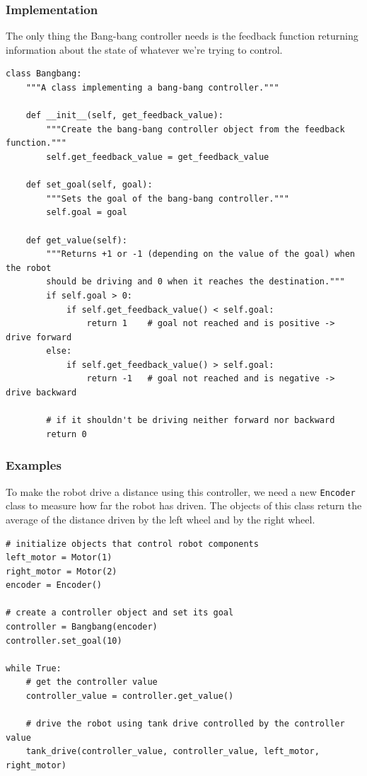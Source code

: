 \documentclass[12pt,twoside]{article}
\begin{document}
\subsubsection{Implementation}
The only thing the Bang-bang controller needs is the feedback function returning information about the state of whatever we're trying to control.

\begin{verbatim}
class Bangbang:
    """A class implementing a bang-bang controller."""

    def __init__(self, get_feedback_value):
        """Create the bang-bang controller object from the feedback function."""
        self.get_feedback_value = get_feedback_value

    def set_goal(self, goal):
        """Sets the goal of the bang-bang controller."""
        self.goal = goal

    def get_value(self):
        """Returns +1 or -1 (depending on the value of the goal) when the robot
        should be driving and 0 when it reaches the destination."""
        if self.goal > 0:
            if self.get_feedback_value() < self.goal:
                return 1    # goal not reached and is positive -> drive forward
        else:
            if self.get_feedback_value() > self.goal:
                return -1   # goal not reached and is negative -> drive backward

        # if it shouldn't be driving neither forward nor backward
        return 0
\end{verbatim}


\subsubsection{Examples}
To make the robot drive a distance using this controller, we need a new \texttt{Encoder} class to measure how far the robot has driven. The objects of this class return the average of the distance driven by the left wheel and by the right wheel.

\begin{verbatim}
# initialize objects that control robot components
left_motor = Motor(1)
right_motor = Motor(2)
encoder = Encoder()

# create a controller object and set its goal
controller = Bangbang(encoder)
controller.set_goal(10)

while True:
    # get the controller value
    controller_value = controller.get_value()

    # drive the robot using tank drive controlled by the controller value
    tank_drive(controller_value, controller_value, left_motor, right_motor)
\end{verbatim}
\end{document}

